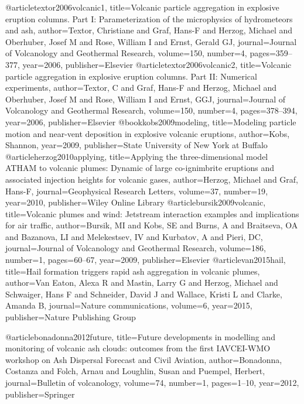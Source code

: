 @article{textor2006volcanic1,
  title={Volcanic particle aggregation in explosive eruption columns. Part I: Parameterization of the microphysics of hydrometeors and ash},
  author={Textor, Christiane and Graf, Hans-F and Herzog, Michael and Oberhuber, Josef M and Rose, William I and Ernst, Gerald GJ},
  journal={Journal of Volcanology and Geothermal Research},
  volume={150},
  number={4},
  pages={359--377},
  year={2006},
  publisher={Elsevier}
}
@article{textor2006volcanic2,
  title={Volcanic particle aggregation in explosive eruption columns. Part II: Numerical experiments},
  author={Textor, C and Graf, Hans-F and Herzog, Michael and Oberhuber, Josef M and Rose, William I and Ernst, GGJ},
  journal={Journal of Volcanology and Geothermal Research},
  volume={150},
  number={4},
  pages={378--394},
  year={2006},
  publisher={Elsevier}
}
@book{kobs2009modeling,
  title={Modeling particle motion and near-vent deposition in explosive volcanic eruptions},
  author={Kobs, Shannon},
  year={2009},
  publisher={State University of New York at Buffalo}
}
@article{herzog2010applying,
  title={Applying the three-dimensional model ATHAM to volcanic plumes: Dynamic of large co-ignimbrite eruptions and associated injection heights for volcanic gases},
  author={Herzog, Michael and Graf, Hans-F},
  journal={Geophysical Research Letters},
  volume={37},
  number={19},
  year={2010},
  publisher={Wiley Online Library}
}
@article{bursik2009volcanic,
  title={Volcanic plumes and wind: Jetstream interaction examples and implications for air traffic},
  author={Bursik, MI and Kobs, SE and Burns, A and Braitseva, OA and Bazanova, LI and Melekestsev, IV and Kurbatov, A and Pieri, DC},
  journal={Journal of Volcanology and Geothermal Research},
  volume={186},
  number={1},
  pages={60--67},
  year={2009},
  publisher={Elsevier}
}
@article{van2015hail,
  title={Hail formation triggers rapid ash aggregation in volcanic plumes},
  author={Van Eaton, Alexa R and Mastin, Larry G and Herzog, Michael and Schwaiger, Hans F and Schneider, David J and Wallace, Kristi L and Clarke, Amanda B},
  journal={Nature communications},
  volume={6},
  year={2015},
  publisher={Nature Publishing Group}
}

@article{bonadonna2012future,
  title={Future developments in modelling and monitoring of volcanic ash clouds: outcomes from the first IAVCEI-WMO workshop on Ash Dispersal Forecast and Civil Aviation},
  author={Bonadonna, Costanza and Folch, Arnau and Loughlin, Susan and Puempel, Herbert},
  journal={Bulletin of volcanology},
  volume={74},
  number={1},
  pages={1--10},
  year={2012},
  publisher={Springer}
}

